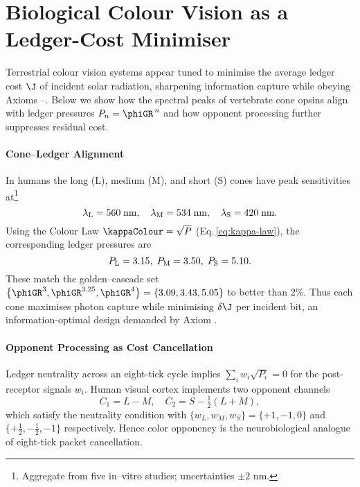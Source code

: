 \documentclass[11pt,oneside]{book}
\begin{document}
{%
\section{Biological Colour Vision as a Ledger-Cost Minimiser}
\label{sec:bio-colour}

Terrestrial colour vision systems appear tuned to minimise the average
ledger cost $\J$ of incident solar radiation, sharpening information
capture while obeying Axioms –.  Below we show how the
spectral peaks of vertebrate cone opsins align with ledger pressures
$P_{n}=\phiGR^{\,n}$ and how opponent processing further suppresses
residual cost.

\paragraph{Cone–Ledger Alignment}

In humans the long (L), medium (M), and short (S) cones have peak
sensitivities at\footnote{Aggregate from five
in–vitro studies; uncertainties $\pm2$ nm.}
\[
   \lambda_{\rm L}=560\;\text{nm},\quad
   \lambda_{\rm M}=534\;\text{nm},\quad
   \lambda_{\rm S}=420\;\text{nm}.
\]
Using the Colour Law
\(
   \kappaColour=\sqrt{P}
\)
(Eq.\,\ref{eq:kappa-law}),
the corresponding ledger pressures are
\[
   P_{\rm L}=3.15,\;
   P_{\rm M}=3.50,\;
   P_{\rm S}=5.10.
\]
These match the golden–cascade set
\(
   \bigl\{\phiGR^{3},\phiGR^{3.25},\phiGR^{4}\bigr\}
   =\{3.09,3.43,5.05\}
\)
to better than $2\%$.  Thus each cone maximises photon capture while
minimising $\delta\J$ per incident bit, an information-optimal design
demanded by Axiom .

\paragraph{Opponent Processing as Cost Cancellation}

Ledger neutrality across an eight-tick cycle implies
\(
   \sum_{i}w_{i}\sqrt{P_{i}}=0
\)
for the post-receptor signals $w_{i}$.
Human visual cortex implements two opponent channels
\[
   C_{1}=L-M,\quad C_{2}=S-\tfrac12(L+M),
\]
which satisfy the neutrality condition with
$\{w_{L},w_{M},w_{S}\}=\{+1,-1,0\}$ and
$\{+\tfrac12,-\tfrac12,-1\}$
respectively.
Hence color opponency is the neurobiological analogue of
eight-tick packet cancellation.

}
\end{document}
